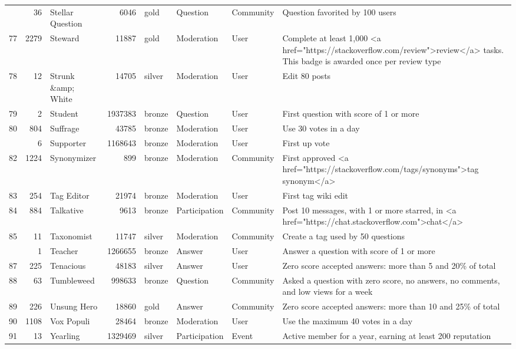 \documentclass[]{book}
\theoremstyle{definition}
\theoremstyle{definition}
\theoremstyle{definition}
\theoremstyle{remark}
\begin{document}
\begin{landscape}
\begin{longtable}[t]{lr>{\raggedright\arraybackslash}p{2cm}rlll>{\raggedright\arraybackslash}p{10cm}}
\addlinespace
76 & 36 & Stellar Question & 6046 & gold & Question & Community & Question favorited by 100 users\\
77 & 2279 & Steward & 11887 & gold & Moderation & User & Complete at least 1,000 <a href="https://stackoverflow.com/review">review</a> tasks. This badge is awarded once per review type\\
78 & 12 & Strunk \&amp; White & 14705 & silver & Moderation & User & Edit 80 posts\\
79 & 2 & Student & 1937383 & bronze & Question & User & First question with score of 1 or more\\
80 & 804 & Suffrage & 43785 & bronze & Moderation & User & Use 30 votes in a day\\
\addlinespace
81 & 6 & Supporter & 1168643 & bronze & Moderation & User & First up vote\\
82 & 1224 & Synonymizer & 899 & bronze & Moderation & Community & First approved <a href="https://stackoverflow.com/tags/synonyms">tag synonym</a>\\
83 & 254 & Tag Editor & 21974 & bronze & Moderation & User & First tag wiki edit\\
84 & 884 & Talkative & 9613 & bronze & Participation & Community & Post 10 messages, with 1 or more starred, in <a href="https://chat.stackoverflow.com">chat</a>\\
85 & 11 & Taxonomist & 11747 & silver & Moderation & Community & Create a tag used by 50 questions\\
\addlinespace
86 & 1 & Teacher & 1266655 & bronze & Answer & User & Answer a question with score of 1 or more\\
87 & 225 & Tenacious & 48183 & silver & Answer & User & Zero score accepted answers: more than 5 and 20\% of total\\
88 & 63 & Tumbleweed & 998633 & bronze & Question & Community & Asked a question with zero score, no answers, no comments, and low views for a week\\
89 & 226 & Unsung Hero & 18860 & gold & Answer & Community & Zero score accepted answers: more than 10 and 25\% of total\\
90 & 1108 & Vox Populi & 28464 & bronze & Moderation & User & Use the maximum 40 votes in a day\\
91 & 13 & Yearling & 1329469 & silver & Participation & Event & Active member for a year, earning at least 200 reputation\\*
\end{longtable}
\end{landscape}
\end{document}
